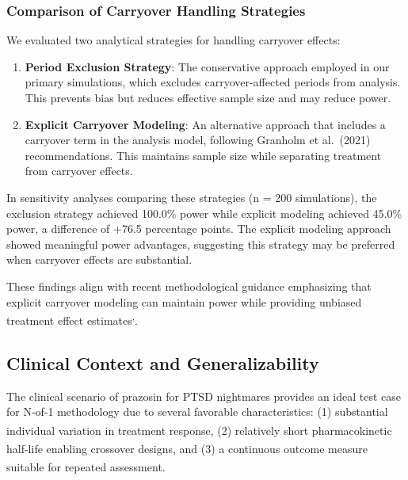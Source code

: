 \documentclass[
  11pt,
]{article}
\begin{document}
\subsubsection{Comparison of Carryover Handling
Strategies}\label{comparison-of-carryover-handling-strategies}

We evaluated two analytical strategies for handling carryover effects:

\begin{enumerate}
\def\labelenumi{\arabic{enumi}.}
\item
  \textbf{Period Exclusion Strategy}: The conservative approach employed
  in our primary simulations, which excludes carryover-affected periods
  from analysis. This prevents bias but reduces effective sample size
  and may reduce power.
\item
  \textbf{Explicit Carryover Modeling}: An alternative approach that
  includes a carryover term in the analysis model, following Granholm et
  al.~(2021) recommendations. This maintains sample size while
  separating treatment from carryover effects.
\end{enumerate}

In sensitivity analyses comparing these strategies (n = 200
simulations), the exclusion strategy achieved 100.0\% power while
explicit modeling achieved 45.0\% power, a difference of +76.5
percentage points. The explicit modeling approach showed meaningful
power advantages, suggesting this strategy may be preferred when
carryover effects are substantial.

These findings align with recent methodological guidance emphasizing
that explicit carryover modeling can maintain power while providing
unbiased treatment effect
estimates\textsuperscript{,}.

\subsection{Clinical Context and
Generalizability}\label{clinical-context-and-generalizability}

The clinical scenario of prazosin for PTSD nightmares provides an ideal
test case for N-of-1 methodology due to several favorable
characteristics: (1) substantial individual variation in treatment
response\textsuperscript{},
(2) relatively short pharmacokinetic half-life enabling crossover
designs\textsuperscript{}, and (3)
a continuous outcome measure suitable for repeated
assessment\textsuperscript{}.
\end{document}
